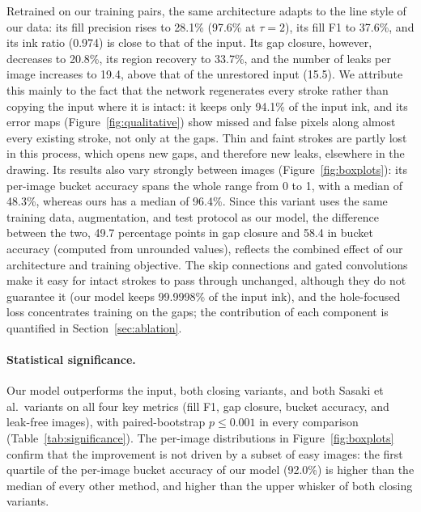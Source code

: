 \documentclass[11pt]{article}
\begin{document}
Retrained on our training pairs, the same architecture adapts to the line style of
our data: its fill precision rises to 28.1\% (97.6\% at $\tau=2$), its fill F1 to
37.6\%, and its ink ratio (0.974) is close to that of the input. Its gap closure,
however, decreases to 20.8\%, its region recovery to 33.7\%, and the number of leaks
per image increases to 19.4, above that of the unrestored input (15.5). We attribute
this mainly to the fact that the network regenerates every stroke rather than copying
the input where it is intact: it keeps only 94.1\% of the input ink, and its error
maps (Figure~\ref{fig:qualitative}) show missed and false pixels along almost every
existing stroke, not only at the gaps. Thin and faint strokes are partly lost in this
process, which opens new gaps, and therefore new leaks, elsewhere in the drawing. Its
results also vary strongly between images (Figure~\ref{fig:boxplots}): its per-image
bucket accuracy spans the whole range from 0 to 1, with a median of 48.3\%, whereas
ours has a median of 96.4\%. Since this variant uses the same training data,
augmentation, and test protocol as our model, the difference between the two, 49.7
percentage points in gap closure and 58.4 in bucket accuracy (computed from unrounded values), reflects the combined
effect of our architecture and training objective. The skip connections and gated convolutions make it easy for intact strokes to pass through unchanged, although they do not guarantee it (our model keeps 99.9998\% of the input ink), and the hole-focused loss concentrates training on the gaps; the contribution of each component is quantified in Section~\ref{sec:ablation}.

\paragraph{Statistical significance.} Our model outperforms the input, both closing
variants, and both Sasaki et al.\ variants on all four key metrics (fill F1, gap
closure, bucket accuracy, and leak-free images), with paired-bootstrap $p \le 0.001$ in
every comparison (Table~\ref{tab:significance}). The per-image distributions in
Figure~\ref{fig:boxplots} confirm that the improvement is not driven by a subset of
easy images: the first quartile of the per-image bucket accuracy of our model
(92.0\%) is higher than the median of every other method, and higher than the upper
whisker of both closing variants.
\end{document}

